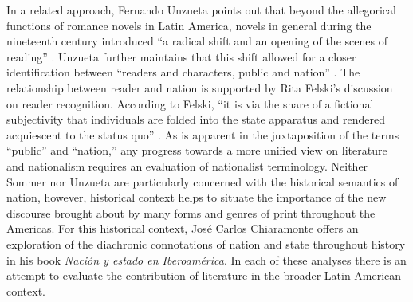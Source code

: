 \documentclass[12pt]{report}
\begin{document}
In a related approach, Fernando Unzueta points out that beyond the allegorical functions of romance novels in Latin America, novels in general during the nineteenth century introduced \enquote{a radical shift and an opening of the scenes of reading} \autocite*[78]{Unzueta2002}. 
Unzueta further maintains that this shift allowed for a closer identification between \enquote{readers and characters, public and nation} \autocite*[78]{Unzueta2002}. 
The relationship between reader and nation is supported by Rita Felski's discussion on reader recognition. According to Felski, \enquote{it is via the snare of a fictional subjectivity that individuals are folded into the state apparatus and rendered acquiescent to the status quo} \autocite*[27]{Felski2008}. As is apparent in the juxtaposition of the terms \enquote{public} and \enquote{nation,} any progress towards a more unified view on literature and nationalism requires an evaluation of nationalist terminology. Neither Sommer nor Unzueta are particularly concerned with the historical semantics of nation, however, historical context helps to situate the importance of the new discourse brought about by many forms and genres of print throughout the Americas. 
For this historical context, José Carlos Chiaramonte offers an exploration of the diachronic connotations of nation and state throughout history in his book \textit{Nación y estado en Iberoamérica}\nocite{Chiaramonte2004}. In each of these analyses there is an attempt to evaluate the contribution of literature in the broader Latin American context.
\end{document}
